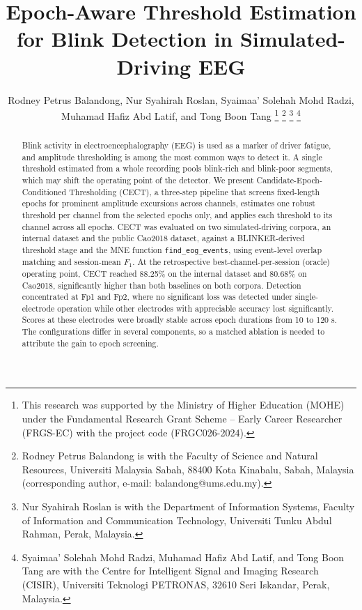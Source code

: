 \documentclass[journal,twoside,web]{ieeecolor}
\begin{document}
\title{Epoch-Aware Threshold Estimation for Blink Detection in Simulated-Driving EEG}

\author{Rodney Petrus Balandong, Nur Syahirah Roslan, Syaimaa' Solehah Mohd Radzi,
Muhamad Hafiz Abd Latif,
    and Tong Boon Tang
\thanks{This research was supported by the Ministry of Higher Education (MOHE)
under the Fundamental Research Grant Scheme -- Early Career Researcher
(FRGS-EC) with the project code (FRGC026-2024).}
\thanks{Rodney Petrus Balandong is with the Faculty of Science and Natural
Resources, Universiti Malaysia Sabah, 88400 Kota Kinabalu, Sabah, Malaysia (corresponding
author, e-mail: balandong@ums.edu.my).}
\thanks{Nur Syahirah Roslan is with the Department of Information Systems,
Faculty of Information and Communication Technology, Universiti Tunku Abdul
Rahman, Perak, Malaysia.}
\thanks{Syaimaa' Solehah Mohd Radzi, Muhamad Hafiz Abd Latif, and Tong Boon
Tang are with the Centre for Intelligent Signal and Imaging Research (CISIR),
Universiti Teknologi PETRONAS, 32610 Seri Iskandar, Perak, Malaysia.}}

\maketitle

\begin{abstract}
Blink activity in electroencephalography (EEG) is used as a marker of driver fatigue, and amplitude thresholding is among the most common ways to detect it. A single threshold estimated from a whole recording pools blink-rich and blink-poor segments, which may shift the operating point of the detector.
We present Candidate-Epoch-Conditioned Thresholding (CECT), a three-step pipeline that screens fixed-length epochs for prominent amplitude excursions across channels, estimates one robust threshold per channel from the selected epochs only, and applies each threshold to its channel across all epochs. CECT was evaluated on two simulated-driving corpora, an internal dataset and the public Cao2018 dataset, against a BLINKER-derived threshold stage and the MNE function \texttt{find\_eog\_events}, using event-level overlap matching and session-mean $F_1$. At the retrospective best-channel-per-session (oracle) operating point, CECT reached 88.25\% on the internal dataset and 80.68\% on Cao2018, significantly higher than both baselines on both corpora. Detection concentrated at Fp1 and Fp2, where no significant loss was detected under single-electrode operation while other electrodes with appreciable accuracy lost significantly. Scores at these electrodes were broadly stable across epoch durations from 10 to 120 s. The configurations differ in several components, so a matched ablation is needed to attribute the gain to epoch screening.
\end{abstract}
\end{document}
